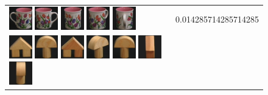 \begin{figure}[!bp]
\begin{tabular}{m{11cm} | m{3cm} |}
\includegraphics[width=1cm]{coil/beeld-7.eps}
\includegraphics[width=1cm]{coil/beeld-6.eps}
\includegraphics[width=1cm]{coil/beeld-8.eps}
\includegraphics[width=1cm]{coil/beeld-9.eps}
\includegraphics[width=1cm]{coil/beeld-11.eps}
& {\scriptsize 0.014285714285714285}
\\
\includegraphics[width=1cm]{coil/beeld-42.eps}
\includegraphics[width=1cm]{coil/beeld-0.eps}
\includegraphics[width=1cm]{coil/beeld-43.eps}
\includegraphics[width=1cm]{coil/beeld-3.eps}
\includegraphics[width=1cm]{coil/beeld-1.eps}
\includegraphics[width=1cm]{coil/beeld-44.eps}
\includegraphics[width=1cm]{coil/beeld-5.eps}

\end{tabular}
\end{figure}

